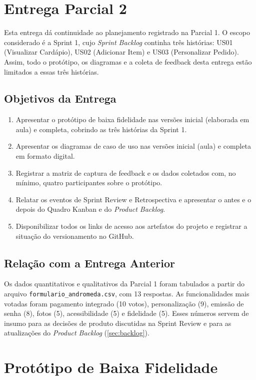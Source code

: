 \documentclass[12pt, oneside, a4paper, chapter=TITLE,section=TITLE]{abntex2}
\begin{document}
\chapter{Entrega Parcial 2}

Esta entrega dá continuidade ao planejamento registrado na Parcial 1. O escopo considerado é a Sprint 1, cujo \textit{Sprint Backlog} continha três histórias: US01 (Visualizar Cardápio), US02 (Adicionar Item) e US03 (Personalizar Pedido). Assim, todo o protótipo, os diagramas e a coleta de feedback desta entrega estão limitados a essas três histórias.

\section{Objetivos da Entrega}

\begin{enumerate}
  \item Apresentar o protótipo de baixa fidelidade nas versões inicial (elaborada em aula) e completa, cobrindo as três histórias da Sprint 1.
  \item Apresentar os diagramas de caso de uso nas versões inicial (aula) e completa em formato digital.
  \item Registrar a matriz de captura de feedback e os dados coletados com, no mínimo, quatro participantes sobre o protótipo.
  \item Relatar os eventos de Sprint Review e Retrospectiva e apresentar o antes e o depois do Quadro Kanban e do \textit{Product Backlog}.
  \item Disponibilizar todos os links de acesso aos artefatos do projeto e registrar a situação do versionamento no GitHub.
\end{enumerate}

\section{Relação com a Entrega Anterior}

Os dados quantitativos e qualitativos da Parcial 1 foram tabulados a partir do arquivo \texttt{formulario\_andromeda.csv}, com 13 respostas. As funcionalidades mais votadas foram pagamento integrado (10 votos), personalização (9), emissão de senha (8), fotos (5), acessibilidade (5) e fidelidade (5). Esses números servem de insumo para as decisões de produto discutidas na Sprint Review e para as atualizações do \textit{Product Backlog} (\ref{sec:backlog}).

\chapter{Protótipo de Baixa Fidelidade}
\end{document}
